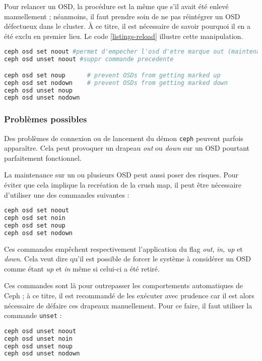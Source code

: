 Pour relancer un OSD, la procédure est la même que s'il avait été enlevé manuellement ; néanmoins, il faut prendre soin de ne pas réintégrer un OSD défectueux dans le cluster. À ce titre, il est nécessaire de savoir pourquoi il en a été exclu en premier lieu. Le code \ref{listings-reload} illustre cette manipulation.
\vspace{3mm}
\begin{lstlisting}[language=bash,caption={Procédure de relancement d'un OSD.}, label=listings-reload]
ceph osd set noout #permet d'empecher l'osd d'etre marque out (maintenance /flappy disk)
ceph osd unset noout #suppr commande precedente

ceph osd set noup      # prevent OSDs from getting marked up
ceph osd set nodown    # prevent OSDs from getting marked down
ceph osd unset noup
ceph osd unset nodown

\end{lstlisting}

\subsubsection{Problèmes possibles}

Des problèmes de connexion ou de lancement du démon \verb|ceph| peuvent parfois apparaître. Cela peut provoquer un drapeau \textit{out} ou \textit{down} sur un OSD pourtant parfaitement fonctionnel.

La maintenance sur un ou plusieurs OSD peut aussi poser des risques.
Pour éviter que cela implique la recréation de la crush map, il peut être nécessaire d'utiliser une des commandes suivantes :  
\vspace{3mm}
\begin{lstlisting}[language=bash]
ceph osd set noout
ceph osd set noin
ceph osd set noup
ceph osd set nodown
\end{lstlisting}

Ces commandes empêchent respectivement l'application du flag \textit{out}, \textit{in}, \textit{up} et \textit{down}. Cela veut dire qu'il est possible de forcer le système à considérer un OSD comme étant \textit{up} et \textit{in} même si celui-ci a été retiré. 

Ces commandes sont là pour outrepasser les comportements automatiques de Ceph ; à ce titre, il est recommandé de les exécuter avec prudence car il est alors nécessaire de défaire ces drapeaux manuellement. Pour ce faire, il faut utiliser la commande \verb|unset| :
\vspace{3mm}
\begin{lstlisting}[language=bash]
ceph osd unset noout
ceph osd unset noin
ceph osd unset noup
ceph osd unset nodown
\end{lstlisting}